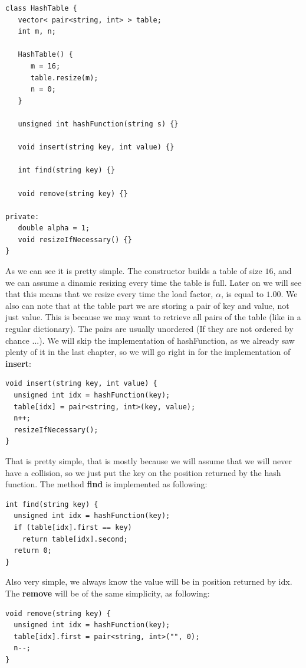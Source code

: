 \begin{lstlisting}
class HashTable {
   vector< pair<string, int> > table;
   int m, n;
   
   HashTable() {
      m = 16;
      table.resize(m);
      n = 0;
   }

   unsigned int hashFunction(string s) {}
   
   void insert(string key, int value) {}

   int find(string key) {}

   void remove(string key) {}

private:
   double alpha = 1;
   void resizeIfNecessary() {}
}
\end{lstlisting}

As we can see it is pretty simple. The constructor builds a table of size \( 16 \), and we can assume a dinamic resizing every time the table is full. Later on we will see that this means that we resize every time the load factor, \( \alpha \), is equal to \( 1.00 \). We also can note that at the table part we are storing a pair of key and value, not just value. This is because we may want to retrieve all pairs of the table (like in a regular dictionary). The pairs are usually unordered (If they are not ordered by chance ...). We will skip the implementation of hashFunction, as we already saw plenty of it in the last chapter, so we will go right in for the implementation of \textbf{insert}:

\begin{lstlisting}
void insert(string key, int value) {
  unsigned int idx = hashFunction(key);
  table[idx] = pair<string, int>(key, value);
  n++;
  resizeIfNecessary();
}
\end{lstlisting}

That is pretty simple, that is mostly because we will assume that we will never have a collision, so we just put the key on the position returned by the hash function. The method \textbf{find} is implemented as following:

\begin{lstlisting}
int find(string key) {
  unsigned int idx = hashFunction(key);
  if (table[idx].first == key)
    return table[idx].second;
  return 0;
}
\end{lstlisting}

Also very simple, we always know the value will be in position returned by idx. The \textbf{remove} will be of the same simplicity, as following:

\begin{lstlisting}
void remove(string key) {
  unsigned int idx = hashFunction(key);
  table[idx].first = pair<string, int>("", 0);
  n--;
}
\end{lstlisting}

